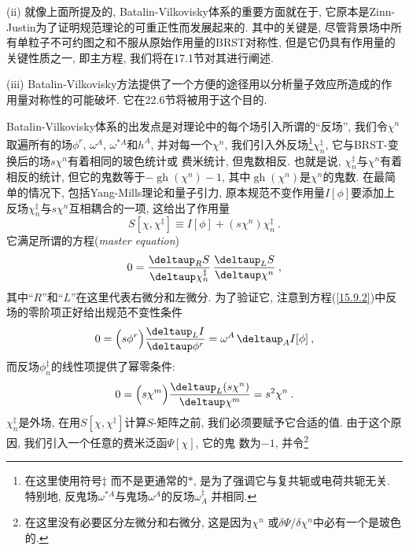 \noindent (ii) 就像上面所提及的, Batalin-Vilkovisky体系的重要方面就在于, 它原本是Zinn-Justin为了证明规范理论的可重正性而发展起来的. 其中的关键是, 
尽管背景场中所有单粒子不可约图之和不服从原始作用量的BRST对称性, 但是它仍具有作用量的关键性质之一, 即主方程, 我们将在17.1节对其进行阐述.

\noindent (iii)  Batalin-Vilkovisky方法提供了一个方便的途径用以分析量子效应所造成的作用量对称性的可能破坏. 它在22.6节将被用于这个目的.


Batalin-Vilkovisky体系的出发点是对理论中的每个场引入所谓的``反场'', 我们令$\chi ^{n}$取遍所有的场$\phi ^{r}$, $\omega ^{A}$, 
$\omega ^{\ast A}$和$h^{A}$, 并对每一个$\chi ^{n}$, 我们引入外反场\footnote{在这里使用符号$\ddag $%
而不是更通常的$\ast $, 是为了强调它与复共轭或电荷共轭无关. 特别地, 反鬼场$\omega ^{\ast A}$与鬼场$\omega ^{A}$的反场$\omega _{A}^{\ddag }$%
并{}相同.}$\chi _{n}^{\ddag }$, 它与BRST-变换后的场$s\chi ^{n}$有着相同的玻色统计或%
费米统计, 但鬼数相反. 也就是说, $\chi _{n}^{\ddag }$与$\chi ^{n}$有着相反的统计, 但它的鬼数等于$-\operatorname{gh}(\chi ^{n})-1$, 
其中$\operatorname{gh}(\chi ^{n})$是$\chi ^{n}$的鬼数. 在最简单的情况下, 包括Yang-Mills理论和量子引力, 原本规范不变作用量$I[\phi ]$要添加上%
反场$\chi _{n}^{\ddag }$与$s\chi ^{n}$互相耦合的一项, 这给出了作用量%
\begin{equation}
S[\chi,\chi^{\ddag}] \equiv I[\phi] + (s\chi^{n})\chi^{\ddag}_{n} \:.  \label{15.9.1}
\end{equation}
它满足所谓的{方程}(\textit{master equation})%
\begin{equation}
 0 = \frac{\deltaup_{R}S}{\deltaup \chi^{\ddag}_{n}}\, \frac{\deltaup_{L}S}{\deltaup \chi^{n}} \:,  \label{15.9.2}
\end{equation}
其中``$R$''和``$L$''在这里代表右微分和左微分. 为了验证它, 注意到方程(\ref{15.9.2})中反场的零阶项正好给出规范不变性条件
\begin{equation}
0=\Big( s\phi ^{r}\Big) \frac{\deltaup_{L}I}{\deltaup\phi ^{r}}=\omega^{A}\,\deltaup _{A}I[\phi ]\:,   \label{15.9.3}
\end{equation}%
而反场$\phi _{n}^{\ddag }$的线性项提供了幂零条件:%
\begin{equation}
0=\Big( s\chi ^{m}\Big) \frac{\deltaup_{L}(s\chi ^{n})}{\deltaup \chi ^{m}}=s^{2}\chi ^{n}\:.   \label{15.9.4}
\end{equation}%
$\chi _{n}^{\ddag }$是外场, 在用$S[\chi ,\chi
^{\ddag }]$计算$S$-矩阵之前, 我们必须要赋予它合适的值. 由于这个原因, 我们引入一个任意的费米泛函$\Psi [ \chi ]$, 它的鬼%
数为$-1$, 并令\footnote{在这里没有必要区分左微分和右微分, 这是因为$\chi ^{n}$%
或$\delta \Psi /\delta \chi ^{n}$中必有一个是玻色的.}%
